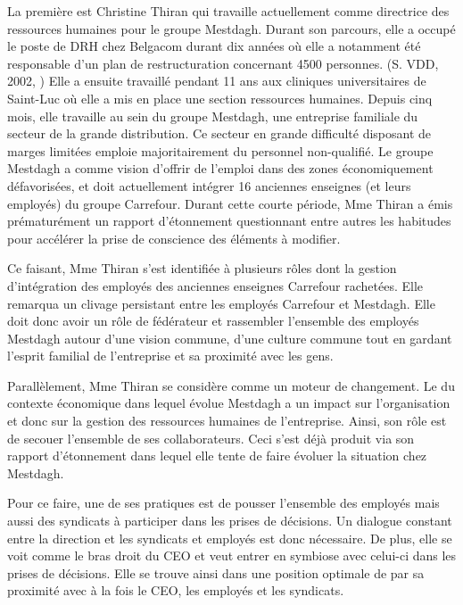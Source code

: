 La première est Christine Thiran qui travaille actuellement comme directrice des ressources humaines pour le groupe Mestdagh. Durant son parcours, elle a occupé le poste de DRH chez Belgacom durant dix années où elle a notamment été responsable d'un plan de restructuration concernant 4500 personnes. (S. VDD, 2002, \cite{planBEST})
Elle a ensuite travaillé pendant 11 ans aux cliniques universitaires de Saint-Luc où elle a mis en place une section ressources humaines.
Depuis cinq mois, elle travaille au sein du groupe Mestdagh, une entreprise familiale du secteur de la grande distribution. Ce secteur en grande difficulté disposant de marges limitées emploie majoritairement du personnel non-qualifié. Le groupe Mestdagh a comme vision d'offrir de l'emploi dans des zones économiquement défavorisées, et doit actuellement intégrer 16 anciennes enseignes (et leurs employés) du groupe Carrefour.
Durant cette courte période, Mme Thiran a émis prématurément un rapport d'étonnement questionnant entre autres les habitudes pour accélérer la prise de conscience des éléments à modifier. \newline

Ce faisant, Mme Thiran s'est identifiée à plusieurs rôles dont la gestion d'intégration des employés des anciennes enseignes Carrefour rachetées. Elle remarqua un clivage persistant entre les employés Carrefour et Mestdagh. Elle doit donc avoir un rôle de fédérateur et rassembler l'ensemble des employés Mestdagh autour d'une vision commune, d'une culture commune tout en gardant l'esprit familial de l'entreprise et sa proximité avec les gens.\newline

Parallèlement, Mme Thiran se considère comme un moteur de changement. Le du contexte économique dans lequel évolue Mestdagh a un impact sur l'organisation et donc sur la gestion des ressources humaines de l'entreprise. Ainsi, son rôle est de secouer l'ensemble de ses collaborateurs. Ceci s'est déjà produit via son rapport d'étonnement dans lequel elle tente de faire évoluer la situation chez Mestdagh.\newline

Pour ce faire, une de ses pratiques est de pousser l'ensemble des employés mais aussi des syndicats à participer dans les prises de décisions. Un dialogue constant entre la direction et les syndicats et employés est donc nécessaire. De plus, elle se voit comme le bras droit du CEO et veut entrer en symbiose avec celui-ci dans les prises de décisions. Elle se trouve ainsi dans une position optimale de par sa proximité avec à la fois le CEO, les employés et les syndicats.\newline

